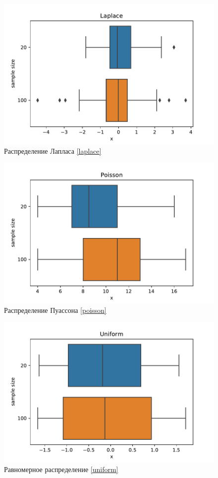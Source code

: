 \documentclass[a4paper]{article}
\begin{document}
\begin{figure}[H]
    \centering
    \includegraphics[width = 16 cm]{sources/LaplaceBox.pdf}
    \caption{Распределение Лапласа \eqref{laplace}}
    \label{fig:laplaceBox}
\end{figure}
\begin{figure}[H]
    \centering
    \includegraphics[width = 16 cm]{sources/PoissonBox.pdf}
    \caption{Распределение Пуассона \eqref{poisson}}
    \label{fig:poissonBox}
\end{figure}
\begin{figure}[H]
    \centering
    \includegraphics[width = 16 cm]{sources/UniformBox.pdf}
    \caption{Равномерное распределение \eqref{uniform}}
    \label{fig:uniformBox}
\end{figure}
\end{document}
